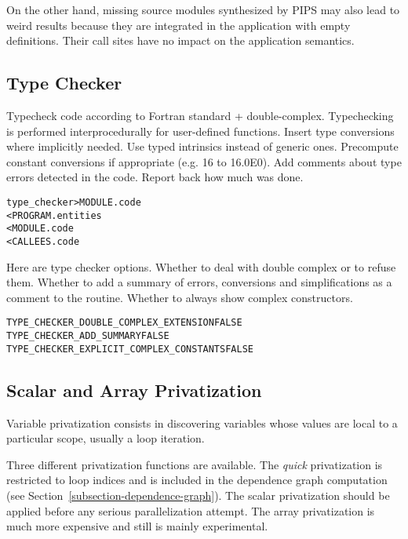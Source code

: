 \documentclass[a4paper]{report}
\newenvironment{PipsProp}{\begin{alltt}}{\end{alltt}}
\newenvironment{PipsMake}{\begin{alltt}}{\end{alltt}}
\begin{document}
On the other hand, missing source modules synthesized by PIPS may also
lead to weird results because they are integrated in the application
with empty definitions. Their call sites have no impact on the
application semantics.


\subsection{Type Checker}
\label{subsection-type-checker}

Typecheck code according to Fortran standard + double-complex.
Typechecking is performed interprocedurally for user-defined functions.
Insert type conversions where implicitly needed.
Use typed intrinsics instead of generic ones.
Precompute constant conversions if appropriate (e.g. 16 to 16.0E0).
Add comments about type errors detected in the code.
Report back how much was done.

\begin{PipsMake}
type_checker            > MODULE.code
        < PROGRAM.entities
        < MODULE.code
        < CALLEES.code
\end{PipsMake}

Here are type checker options. Whether to deal with double complex or to
refuse them. Whether to add a summary of errors, conversions and
simplifications as a comment to the routine. Whether to always show complex
constructors.

\begin{PipsProp}
TYPE_CHECKER_DOUBLE_COMPLEX_EXTENSION FALSE
TYPE_CHECKER_ADD_SUMMARY FALSE
TYPE_CHECKER_EXPLICIT_COMPLEX_CONSTANTS FALSE
\end{PipsProp}


\subsection{Scalar and Array Privatization}
\label{sec:scalar-and-array-privatization}

Variable privatization consists in discovering variables whose values are
local to a particular scope, usually a loop iteration.

Three different privatization functions are available. The {\em quick}
privatization is restricted to loop indices and is included in the
dependence graph computation (see
Section~\ref{subsection-dependence-graph}). The scalar privatization should
be applied before any serious parallelization attempt. The array
privatization is much more expensive and still is mainly experimental.
\end{document}
